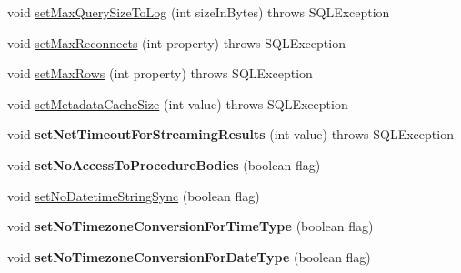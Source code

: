 \begin{DoxyCompactItemize}
\item 
void \mbox{\hyperlink{classcom_1_1mysql_1_1jdbc_1_1jdbc2_1_1optional_1_1_connection_wrapper_ac2fc5533a1f39ec379f5641cd048a91f}{set\+Max\+Query\+Size\+To\+Log}} (int size\+In\+Bytes)  throws S\+Q\+L\+Exception 
\item 
void \mbox{\hyperlink{classcom_1_1mysql_1_1jdbc_1_1jdbc2_1_1optional_1_1_connection_wrapper_aeed825d6bd8942b00610c43d8a8c82ef}{set\+Max\+Reconnects}} (int property)  throws S\+Q\+L\+Exception 
\item 
void \mbox{\hyperlink{classcom_1_1mysql_1_1jdbc_1_1jdbc2_1_1optional_1_1_connection_wrapper_a21b7e7ac26548d9266485dce22f5af21}{set\+Max\+Rows}} (int property)  throws S\+Q\+L\+Exception 
\item 
void \mbox{\hyperlink{classcom_1_1mysql_1_1jdbc_1_1jdbc2_1_1optional_1_1_connection_wrapper_aa2b3fbef9bed38d8dd555e8f0f7c3598}{set\+Metadata\+Cache\+Size}} (int value)  throws S\+Q\+L\+Exception 
\item 
\mbox{\label{classcom_1_1mysql_1_1jdbc_1_1jdbc2_1_1optional_1_1_connection_wrapper_a5bf730f7c304e2d073ee6fd86ed10c4f}} 
void {\bfseries set\+Net\+Timeout\+For\+Streaming\+Results} (int value)  throws S\+Q\+L\+Exception 
\item 
\mbox{\label{classcom_1_1mysql_1_1jdbc_1_1jdbc2_1_1optional_1_1_connection_wrapper_a719e8578ac412a62cb5e0178c244c5e8}} 
void {\bfseries set\+No\+Access\+To\+Procedure\+Bodies} (boolean flag)
\item 
void \mbox{\hyperlink{classcom_1_1mysql_1_1jdbc_1_1jdbc2_1_1optional_1_1_connection_wrapper_a5df2417575df4f6bdb7ba14ffc39b979}{set\+No\+Datetime\+String\+Sync}} (boolean flag)
\item 
\mbox{\label{classcom_1_1mysql_1_1jdbc_1_1jdbc2_1_1optional_1_1_connection_wrapper_aefb08e3b79f820e0eddb6f3f96199d2c}} 
void {\bfseries set\+No\+Timezone\+Conversion\+For\+Time\+Type} (boolean flag)
\item 
\mbox{\label{classcom_1_1mysql_1_1jdbc_1_1jdbc2_1_1optional_1_1_connection_wrapper_ae603a5ae1e09145a278d5e0cbbde1e4e}} 
void {\bfseries set\+No\+Timezone\+Conversion\+For\+Date\+Type} (boolean flag)

\end{DoxyCompactItemize}
